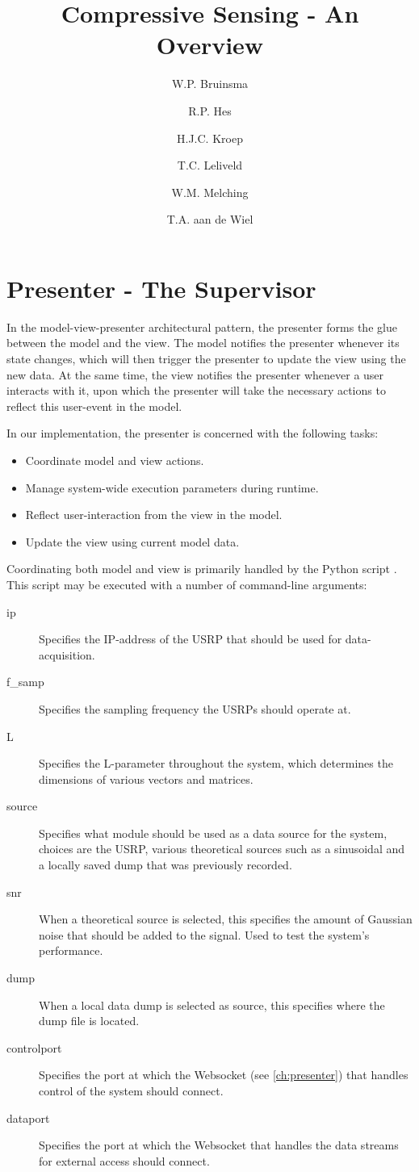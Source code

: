 \documentclass[a4paper, openany, oneside]{memoir}
\title{Compressive Sensing - An Overview}
\author{W.P. Bruinsma \and R.P. Hes \and H.J.C. Kroep \and T.C. Leliveld \and W.M. Melching \and T.A. aan de Wiel}
\begin{document}
\chapter{Presenter - The Supervisor}
\label{cha:presenter}
In the model-view-presenter architectural pattern, the presenter forms the glue between the model and the view. The model notifies the presenter whenever its state changes, which will then trigger the presenter to update the view using the new data. At the same time, the view notifies the presenter whenever a user interacts with it, upon which the presenter will take the necessary actions to reflect this user-event in the model.

In our implementation, the presenter is concerned with the following tasks:
\begin{itemize}
	\item Coordinate model and view actions.
	\item Manage system-wide execution parameters during runtime.
	\item Reflect user-interaction from the view in the model.
	\item Update the view using current model data.
\end{itemize}

Coordinating both model and view is primarily handled by the Python script . This script may be executed with a number of command-line arguments:

\begin{description}
	\item[ip] Specifies the IP-address of the USRP that should be used for data-acquisition.
	\item[f\_samp] Specifies the sampling frequency the USRPs should operate at.
	\item[L] Specifies the L-parameter throughout the system, which determines the dimensions of various vectors and matrices.
	\item[source] Specifies what module should be used as a data source for the system, choices are the USRP, various theoretical sources such as a sinusoidal and a locally saved dump that was previously recorded.
	\item[snr] When a theoretical source is selected, this specifies the amount of Gaussian noise that should be added to the signal. Used to test the system's performance.
	\item[dump] When a local data dump is selected as source, this specifies where the dump file is located.
	\item[controlport] Specifies the port at which the Websocket (see \cref{ch:presenter}) that handles control of the system should connect.
	\item[dataport] Specifies the port at which the Websocket that handles the data streams for external access should connect.
\end{description}
\end{document}
